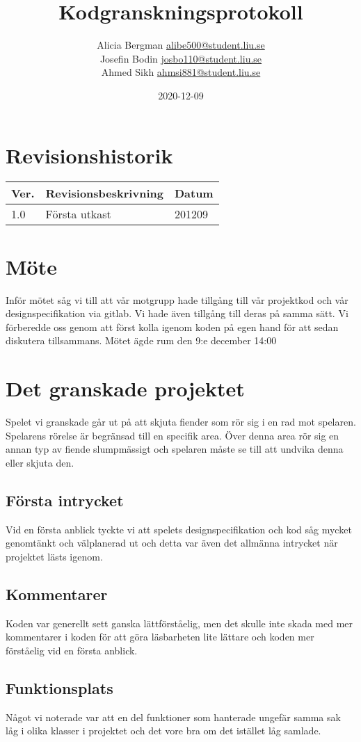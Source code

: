 \documentclass{TDP005mall}
\author{Alicia Bergman \url {alibe500@student.liu.se}\\
  Josefin Bodin \url {josbo110@student.liu.se}\\
  Ahmed Sikh \url {ahmsi881@student.liu.se}}
\title{Kodgranskningsprotokoll}
\date{2020-12-09}
\begin{document}
\projectpage
\section{Revisionshistorik}
\begin{table}[!h]
\begin{tabularx}{\linewidth}{|l|X|l|}
\hline
Ver. & Revisionsbeskrivning & Datum \\\hline
1.0 & Första utkast & 201209 \\\hline
\end{tabularx}
\end{table}


\section{Möte}
Inför mötet såg vi till att vår motgrupp hade tillgång till vår projektkod och
vår designspecifikation via gitlab. Vi hade även tillgång till deras på samma
sätt. Vi förberedde oss genom att först kolla igenom koden på egen hand för att
sedan diskutera tillsammans. Mötet ägde rum den 9:e december 14:00

\section{Det granskade projektet}
Spelet vi granskade går ut på att skjuta fiender som rör sig i en rad mot
spelaren. Spelarens rörelse är begränsad till en specifik area. Över denna area
rör sig en annan typ av fiende slumpmässigt och spelaren måste se till att
undvika denna eller skjuta den. 

\subsection{Första intrycket}
Vid en första anblick tyckte vi att spelets designspecifikation och kod såg mycket genomtänkt och välplanerad ut och detta var även det allmänna intrycket
när projektet lästs igenom.

\subsection{Kommentarer}
Koden var generellt sett ganska lättförståelig, men det skulle inte skada med
mer kommentarer i koden för att göra läsbarheten lite lättare och koden mer
förståelig vid en första anblick.

\subsection{Funktionsplats}
Något vi noterade var att en del funktioner som hanterade ungefär samma sak låg
i olika klasser i projektet och det vore bra om det istället låg samlade.
\end{document}
